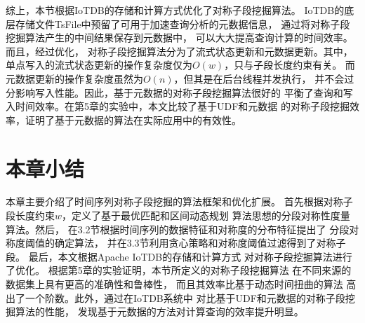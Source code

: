 综上，本节根据IoTDB的存储和计算方式优化了对称子段挖掘算法。
IoTDB的底层存储文件TsFile中预留了可用于加速查询分析的元数据信息，
通过将对称子段挖掘算法产生的中间结果保存到元数据中，
可以大大提高查询计算的时间效率。而且，经过优化，
对称子段挖掘算法分为了流式状态更新和元数据更新。其中，
单点写入的流式状态更新的操作复杂度仅为$O(w)$，只与子段长度约束有关。
而元数据更新的操作复杂度虽然为$O(n)$，但其是在后台线程并发执行，
并不会过分影响写入性能。因此，基于元数据的对称子段挖掘算法很好的
平衡了查询和写入时间效率。在第5章的实验中，本文比较了基于UDF和元数据
的对称子段挖掘效率，证明了基于元数据的算法在实际应用中的有效性。


\section{本章小结}
本章主要介绍了时间序列对称子段挖掘的算法框架和优化扩展。
首先根据对称子段长度约束$w$，定义了基于最优匹配和区间动态规划
算法思想的分段对称性度量算法。然后，
在3.2节根据时间序列的数据特征和对称度的分布特征提出了
分段对称度阈值的确定算法，
并在3.3节利用贪心策略和对称度阈值过滤得到了对称子段。
最后，本文根据Apache IoTDB的存储和计算方式
对对称子段挖掘算法进行了优化。
根据第5章的实验证明，本节所定义的对称子段挖掘算法
在不同来源的数据集上具有更高的准确性和鲁棒性，
而且其效率比基于动态时间扭曲的算法
高出了一个阶数。此外，通过在IoTDB系统中
对比基于UDF和元数据的对称子段挖掘算法的性能，
发现基于元数据的方法对计算查询的效率提升明显。






